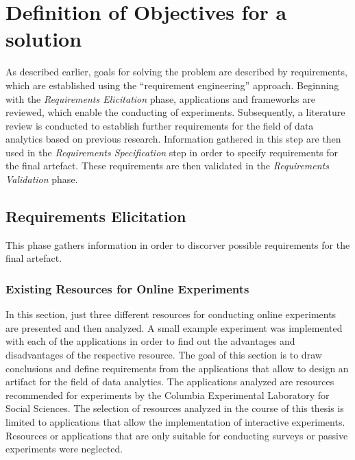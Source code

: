 \newpage\section{Definition of Objectives for a solution}\label{sec:objectForSolution}

As described earlier, goals for solving the problem are described by requirements, which are established using the \enquote{requirement engineering} approach. Beginning with the \textit{Requirements Elicitation} phase, applications and frameworks are reviewed, which enable the conducting of experiments. Subsequently, a literature review is conducted to establish further requirements for the field of data analytics based on previous research. Information gathered in this step are then used in the \textit{Requirements Specification} step in order to specify requirements for the final artefact. These requirements are then validated in the \textit{Requirements Validation} phase.

\subsection{Requirements Elicitation}

This phase gathers information in order to discorver possible requirements for the final artefact.

\subsubsection{Existing Resources for Online Experiments}

In this section, just three different resources for conducting online experiments are presented and then analyzed. A small example experiment was implemented with each of the applications in order to find out the advantages and disadvantages of the respective resource. The goal of this section is to draw conclusions and define requirements from the applications that allow to design an artifact for the field of data analytics. The applications analyzed are resources recommended for experiments by the Columbia Experimental Laboratory for Social Sciences. The selection of resources analyzed in the course of this thesis is limited to applications that allow the implementation of interactive experiments. Resources or applications that are only suitable for conducting surveys or passive experiments were neglected.

